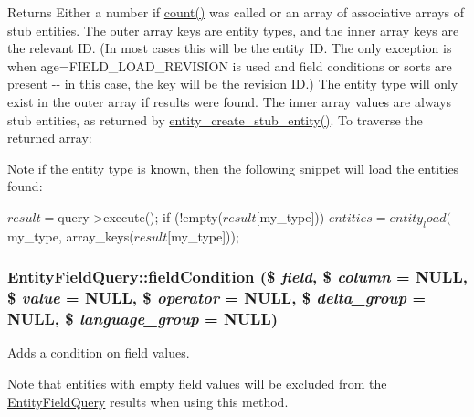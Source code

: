 \begin{DoxyReturn}{Returns}
Either a number if \hyperlink{classEntityFieldQuery_afa3972b551da6115ad5749646df151d4}{count()} was called or an array of associative arrays of stub entities. The outer array keys are entity types, and the inner array keys are the relevant ID. (In most cases this will be the entity ID. The only exception is when age=FIELD\_\-LOAD\_\-REVISION is used and field conditions or sorts are present -\/-\/ in this case, the key will be the revision ID.) The entity type will only exist in the outer array if results were found. The inner array values are always stub entities, as returned by \hyperlink{common_8inc_af0b338fb292ad46545a3d35178a0155b}{entity\_\-create\_\-stub\_\-entity()}. To traverse the returned array: 
\begin{DoxyCode}
     foreach ($query->execute() as $entity_type => $entities) {
       foreach ($entities as $entity_id => $entity) {
\end{DoxyCode}
 Note if the entity type is known, then the following snippet will load the entities found: 
\begin{DoxyCode}
     $result = $query->execute();
     if (!empty($result[$my_type])) {
       $entities = entity_load($my_type, array_keys($result[$my_type]));
     }
\end{DoxyCode}
 
\end{DoxyReturn}
\hypertarget{classEntityFieldQuery_aa8f9660691c0ff6aca2e535c3df78e92}{
\subsubsection[{fieldCondition}]{\setlength{\rightskip}{0pt plus 5cm}EntityFieldQuery::fieldCondition (\$ {\em field}, \/  \$ {\em column} = {\ttfamily NULL}, \/  \$ {\em value} = {\ttfamily NULL}, \/  \$ {\em operator} = {\ttfamily NULL}, \/  \$ {\em delta\_\-group} = {\ttfamily NULL}, \/  \$ {\em language\_\-group} = {\ttfamily NULL})}}
\label{classEntityFieldQuery_aa8f9660691c0ff6aca2e535c3df78e92}
Adds a condition on field values.

Note that entities with empty field values will be excluded from the \hyperlink{classEntityFieldQuery}{EntityFieldQuery} results when using this method.


